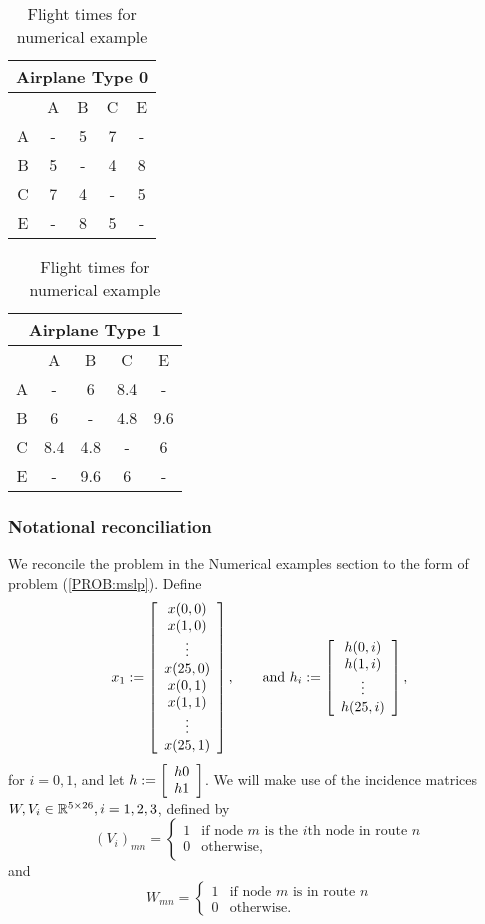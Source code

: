 \begin{table}[ht]
\caption{Flight times for numerical example}
\label{CARGO:times}
\begin{center}
\begin{tabular}{|c|c|c|c|c|}
\multicolumn{5}{c}{Airplane Type 0}\\ \hline
 & A & B & C & E\\ \hline
A & - & 5 & 7 & -\\ \hline
B & 5 & - & 4 & 8\\ \hline
C & 7 & 4 & - & 5\\ \hline
E & - & 8 & 5 & -\\ \hline
\end{tabular}
\hspace{1cm}
\begin{tabular}{|c|c|c|c|c|}
\multicolumn{5}{c}{Airplane Type 1}\\
\hline
 & A & B & C & E\\ \hline
A & - & 6 & 8.4 & -\\ \hline
B & 6 & - & 4.8 & 9.6\\ \hline
C & 8.4 & 4.8 & - & 6\\ \hline
E & - & 9.6 & 6 & -\\ \hline
\end{tabular}
\end{center}
\end{table}%


\subsubsection{Notational reconciliation}
We reconcile the problem in the Numerical examples section to the form of problem (\ref{PROB:mslp}).  Define
\[
x_1\assign \left[\ajfbox{x(0,0)\\ x(1,0)\\ \vdots\\ x(25,0)\\x(0,1)\\ x(1,1)\\ \vdots\\ x(25,1)}\right], \qquad \text{and }%
h_i\assign \left[\ajfbox{h(0,i)\\h(1,i)\\ \vdots\\ h(25,i)}\right],
\]
for $i=0,1$, and let $\displaystyle h:= \left[\begin{array}{c}h0\\h1\end{array}\right]$.  We will make use of the incidence matrices $W, V_i \in {\mathbb R}^{5\times 26}, i= 1,2,3$, defined by
\[
(V_i)_{mn} =\begin{cases} 1 & \text{if node $m$ is the $i$th node in route $n$}\\
0 & \text{otherwise},\end{cases}
\]
and 
\[
W_{mn} =\begin{cases} 1 & \text{if node $m$ is in route $n$}\\
0 & \text{otherwise}.\end{cases}
\]

